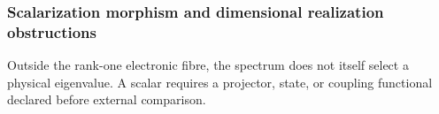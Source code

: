 \let\section\subsection
\let\subsection\subsubsection
\let\subsubsection\paragraph
\let\clearpage\relax

\endgroup
\begingroup
\let\chapter\section
\let\section\subsection
\let\subsection\subsubsection
\let\subsubsection\paragraph
\let\clearpage\relax

\endgroup

\section{Scalarization morphism and dimensional realization obstructions}
Outside the rank-one electronic fibre, the spectrum does not itself select a
physical eigenvalue. A scalar requires a projector, state, or coupling functional
declared before external comparison.
